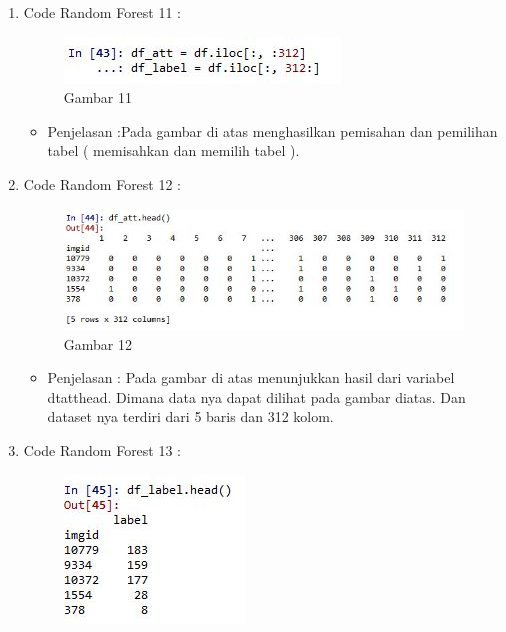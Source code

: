 \begin{enumerate}
\item Code Random Forest 11 :
\par
\begin{figure}[ht]
\centering
\includegraphics[scale=0.7]{figures/AFS/4k.jpg}
\caption{Gambar 11}
\label{contoh}
\end{figure}
\par
\begin{itemize}
\item Penjelasan :Pada gambar di atas menghasilkan pemisahan dan pemilihan tabel ( memisahkan dan memilih tabel ). 
\par
\par
\end{itemize}
\item Code Random Forest 12 :
\par
\begin{figure}[ht]
\centering
\includegraphics[scale=0.7]{figures/AFS/4l.jpg}
\caption{Gambar 12}
\label{contoh}
\end{figure}
\par
\begin{itemize}
\item Penjelasan : Pada gambar di atas menunjukkan hasil dari variabel dtatthead. Dimana data nya dapat dilihat pada gambar diatas. Dan dataset nya terdiri dari 5 baris dan 312 kolom.
\par
\par
\end{itemize}
\item Code Random Forest 13 :
\par
\begin{figure}[ht]
\centering
\includegraphics[scale=0.7]{figures/AFS/4m.jpg}

\end{figure}
\end{enumerate}
